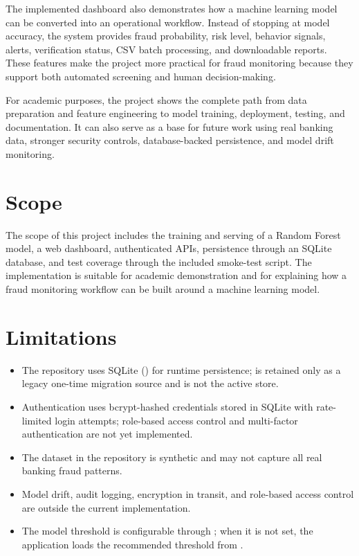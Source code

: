 \documentclass[12pt,a4paper]{report}
\begin{document}
The implemented dashboard also demonstrates how a machine learning model can be converted into an operational workflow. Instead of stopping at model accuracy, the system provides fraud probability, risk level, behavior signals, alerts, verification status, CSV batch processing, and downloadable reports. These features make the project more practical for fraud monitoring because they support both automated screening and human decision-making.

For academic purposes, the project shows the complete path from data preparation and feature engineering to model training, deployment, testing, and documentation. It can also serve as a base for future work using real banking data, stronger security controls, database-backed persistence, and model drift monitoring.

\section{Scope}
The scope of this project includes the training and serving of a Random Forest model, a web dashboard, authenticated APIs, persistence through an SQLite database, and test coverage through the included smoke-test script. The implementation is suitable for academic demonstration and for explaining how a fraud monitoring workflow can be built around a machine learning model.

\section{Limitations}
\begin{itemize}
    \item The repository uses SQLite () for runtime persistence;  is retained only as a legacy one-time migration source and is not the active store.
    \item Authentication uses bcrypt-hashed credentials stored in SQLite with rate-limited login attempts; role-based access control and multi-factor authentication are not yet implemented.
    \item The dataset in the repository is synthetic and may not capture all real banking fraud patterns.
    \item Model drift, audit logging, encryption in transit, and role-based access control are outside the current implementation.
    \item The model threshold is configurable through ; when it is not set, the application loads the recommended threshold from .
\end{itemize}
\end{document}
